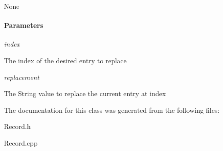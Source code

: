  None

\paragraph*{Parameters}





{\itshape index}
\begin{DoxyItemize}
\item The index of the desired entry to replace
\end{DoxyItemize}

{\itshape replacement}
\begin{DoxyItemize}
\item The String value to replace the current entry at index 
\end{DoxyItemize}

The documentation for this class was generated from the following files\-:\begin{DoxyCompactItemize}
\item 
Record.\-h\item 
Record.\-cpp\end{DoxyCompactItemize}
